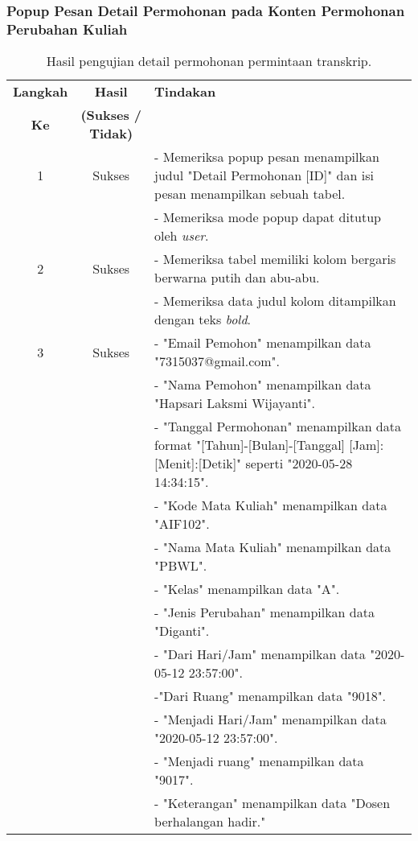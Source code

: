\subsubsection{Popup Pesan Detail Permohonan pada Konten Permohonan Perubahan Kuliah}
\begin{table}[H]
	\centering 
	\caption{Hasil pengujian detail permohonan permintaan transkrip.}
	\label{hasil:DetailPermohonanPerubahanKuliah}
	\begin{tabular}{|c| c| p{}|}
		\toprule
		\textbf{Langkah} & \textbf{Hasil} & \textbf{Tindakan}\\
		\textbf{Ke} & \textbf{(Sukses / Tidak)} &\\
		\midrule
		1&Sukses& - Memeriksa popup pesan menampilkan judul "Detail Permohonan [ID]" dan isi pesan menampilkan sebuah tabel.\\
		&& - Memeriksa mode popup dapat ditutup oleh \textit{user}.\\
		\hline
		2&Sukses&- Memeriksa tabel memiliki kolom bergaris berwarna putih dan abu-abu.\\
		&& - Memeriksa data judul kolom ditampilkan dengan teks \textit{bold}.	\\	
		\hline
		3&Sukses&- "Email Pemohon" menampilkan data "7315037@gmail.com".\\
		&&- "Nama Pemohon" menampilkan data "Hapsari Laksmi Wijayanti".\\
		&&- "Tanggal Permohonan" menampilkan data format "[Tahun]-[Bulan]-[Tanggal] [Jam]:[Menit]:[Detik]" seperti "2020-05-28 14:34:15".\\
		&&- "Kode Mata Kuliah" menampilkan data "AIF102".\\
		&&- "Nama Mata Kuliah" menampilkan data "PBWL".\\
		&&- "Kelas" menampilkan data "A".\\
		&&- "Jenis Perubahan" menampilkan data "Diganti".\\
		&&- "Dari Hari/Jam" menampilkan data "2020-05-12 23:57:00".\\
		&& -"Dari Ruang" menampilkan data "9018".\\
		&&- "Menjadi Hari/Jam" menampilkan data "2020-05-12 23:57:00".\\
		&&- "Menjadi ruang" menampilkan data "9017".\\
		&&- "Keterangan" menampilkan data "Dosen berhalangan hadir."\\
		\bottomrule		
	\end{tabular} 
\end{table}


